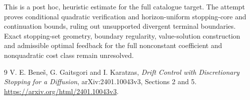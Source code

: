 \documentclass[11pt]{article}
\theoremstyle{definition}
\begin{document}
This is a post hoc, heuristic estimate for the full catalogue target.
The attempt proves conditional quadratic verification and horizon-uniform stopping-core and continuation bounds, ruling out unsupported divergent terminal boundaries. Exact stopping-set geometry, boundary regularity, value-solution construction and admissible optimal feedback for the full nonconstant coefficient and nonquadratic cost class remain unresolved.

\begin{thebibliography}{9}
 V. E. Bene\v{s}, G. Gaitsgori and I. Karatzas,
\emph{Drift Control with Discretionary Stopping for a Diffusion},
arXiv:2401.10043v3, Sections 2 and 5.
\url{https://arxiv.org/html/2401.10043v3}.
\end{thebibliography}
\end{document}
